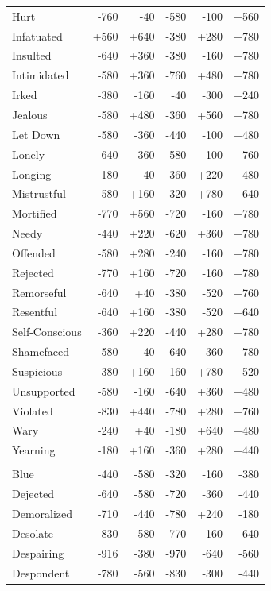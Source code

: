 \begin{longtable}{@{}p{}rrrrr@{}}
Hurt & -760 & -40 & -580 & -100 & +560 \\
Infatuated & +560 & +640 & -380 & +280 & +780 \\
Insulted & -640 & +360 & -380 & -160 & +780 \\
Intimidated & -580 & +360 & -760 & +480 & +780 \\
Irked & -380 & -160 & -40 & -300 & +240 \\
Jealous & -580 & +480 & -360 & +560 & +780 \\
Let Down & -580 & -360 & -440 & -100 & +480 \\
Lonely & -640 & -360 & -580 & -100 & +760 \\
Longing & -180 & -40 & -360 & +220 & +480 \\
Mistrustful & -580 & +160 & -320 & +780 & +640 \\
Mortified & -770 & +560 & -720 & -160 & +780 \\
Needy & -440 & +220 & -620 & +360 & +780 \\
Offended & -580 & +280 & -240 & -160 & +780 \\
Rejected & -770 & +160 & -720 & -160 & +780 \\
Remorseful & -640 & +40 & -380 & -520 & +760 \\
Resentful & -640 & +160 & -380 & -520 & +640 \\
Self-Conscious & -360 & +220 & -440 & +280 & +780 \\
Shamefaced & -580 & -40 & -640 & -360 & +780 \\
Suspicious & -380 & +160 & -160 & +780 & +520 \\
Unsupported & -580 & -160 & -640 & +360 & +480 \\
Violated & -830 & +440 & -780 & +280 & +760 \\
Wary & -240 & +40 & -180 & +640 & +480 \\
Yearning & -180 & +160 & -360 & +280 & +440 \\
\addlinespace[2pt]\multicolumn{6}{@{}l}{\textbf{Withdrawn \& Low Arousal} ($n=34$)} \\
Blue & -440 & -580 & -320 & -160 & -380 \\
Dejected & -640 & -580 & -720 & -360 & -440 \\
Demoralized & -710 & -440 & -780 & +240 & -180 \\
Desolate & -830 & -580 & -770 & -160 & -640 \\
Despairing & -916 & -380 & -970 & -640 & -560 \\
Despondent & -780 & -560 & -830 & -300 & -440 \\

\end{longtable}
